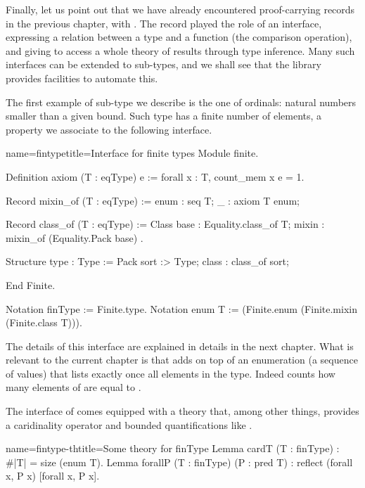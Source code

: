 Finally, let us point out that we have already encountered proof-carrying
records in the previous chapter, with .
The  record played the role of an interface,
expressing a relation between a type and a function (the comparison operation),
and giving to access a whole theory of results through type inference.
Many such interfaces can be extended to sub-types, and we shall see that
the \mcbMC{} library provides facilities to automate this.

\mcbLEARN{}
\mcbNOTES{}

The first example of sub-type we describe is the one of ordinals:
natural numbers smaller than a given bound.  Such type has a finite
number of elements, a property we associate to the following
interface.

\begin{coq}{name=fintype}{title=Interface for finite types}
Module finite.

Definition axiom (T : eqType) e :=
  forall x : T, count_mem x e = 1.

Record mixin_of (T : eqType) := {
  enum : seq T;
  _ : axiom T enum;
}

Record class_of (T : eqType) := Class {
  base : Equality.class_of T;
  mixin : mixin_of (Equality.Pack base)
}.

Structure type : Type := Pack {
  sort :> Type;
  class : class_of sort;
}

End Finite.

Notation finType := Finite.type.
Notation enum T := (Finite.enum (Finite.mixin (Finite.class T))).
\end{coq}

The details of this interface are explained in details in the next
chapter.  What is relevant to the current chapter is that 
adds on top of  an enumeration (a sequence of values) that
lists exactly once all elements in the type.  Indeed 
counts how many elements of  are equal to .

The interface of  comes equipped with a theory that, among
other things, provides a caridinality operator  and bounded
quantifications like \C{[forall x, P]}.

\begin{coq}{name=fintype-th}{title=Some theory for finType}
Lemma cardT (T : finType) : #|T| = size (enum T).
Lemma forallP (T : finType) (P : pred T) :
  reflect (forall x, P x) [forall x, P x].
\end{coq}

